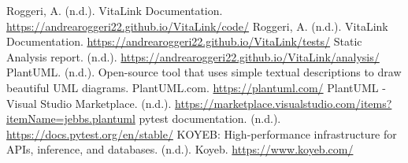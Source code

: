 \documentclass[12pt,a4paper,oneside]{report}
\begin{document}
\begin{thebibliography}{99}
     Roggeri, A. (n.d.). VitaLink Documentation. \url{https://andrearoggeri22.github.io/VitaLink/code/}
     Roggeri, A. (n.d.). VitaLink Documentation. \url{https://andrearoggeri22.github.io/VitaLink/tests/}
     Static Analysis report. (n.d.). \url{https://andrearoggeri22.github.io/VitaLink/analysis/}
     PlantUML. (n.d.). Open-source tool that uses simple textual descriptions to draw beautiful UML diagrams. PlantUML.com. \url{https://plantuml.com/}
     PlantUML - Visual Studio Marketplace. (n.d.). \url{https://marketplace.visualstudio.com/items?itemName=jebbs.plantuml}
     pytest documentation. (n.d.). \url{https://docs.pytest.org/en/stable/}
     KOYEB: High-performance infrastructure for APIs, inference, and databases. (n.d.). Koyeb. \url{https://www.koyeb.com/}
\end{thebibliography}
\end{document}
